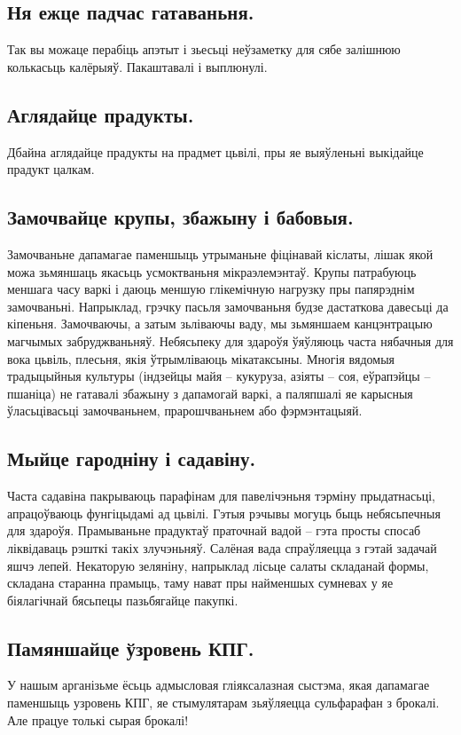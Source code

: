 \subsection{Ня ежце падчас гатаваньня.}
Так вы можаце перабіць апэтыт і зьесьці неўзаметку для сябе залішнюю колькасьць калёрыяў. Пакаштавалі і выплюнулі.

\subsection{Аглядайце прадукты.}
Дбайна аглядайце прадукты на прадмет цьвілі, пры яе выяўленьні выкідайце прадукт цалкам.

\subsection{Замочвайце крупы, збажыну і бабовыя.}
Замочваньне дапамагае паменшыць утрыманьне фіцінавай кіслаты, лішак якой можа зьмяншаць якасьць усмоктваньня мікраэлемэнтаў. Крупы патрабуюць меншага часу варкі і даюць меншую глікемічную нагрузку пры папярэднім замочваньні. Напрыклад, грэчку пасьля замочваньня будзе дастаткова давесьці да кіпеньня. Замочваючы, а затым зьліваючы ваду, мы зьмяншаем канцэнтрацыю магчымых забруджваньняў. Небясьпеку для здароўя ўяўляюць часта нябачныя для вока цьвіль, плесьня, якія ўтрымліваюць мікатаксыны. Многія вядомыя традыцыйныя культуры (індзейцы майя – кукуруза, азіяты – соя, еўрапэйцы – пшаніца) не гатавалі збажыну з дапамогай варкі, а паляпшалі яе карысныя ўласьцівасьці замочваньнем, прарошчваньнем або фэрмэнтацыяй.

\subsection{Мыйце гародніну і садавіну.}
Часта садавіна пакрываюць парафінам для павелічэньня тэрміну прыдатнасьці, апрацоўваюць фунгіцыдамі ад цьвілі. Гэтыя рэчывы могуць быць небясьпечныя для здароўя. Прамываньне прадуктаў праточнай вадой – гэта просты спосаб ліквідаваць рэшткі такіх злучэньняў. Салёная вада спраўляецца з гэтай задачай яшчэ лепей. Некаторую зеляніну, напрыклад лісьце салаты складанай формы, складана старанна прамыць, таму нават пры найменшых сумневах у яе біялагічнай бясьпецы пазьбягайце пакупкі.

\subsection{Памяншайце ўзровень КПГ.}
У нашым арганізьме ёсьць адмысловая гліяксалазная сыстэма, якая дапамагае паменшыць узровень КПГ, яе стымулятарам зьяўляецца сульфарафан з брокалі. Але працуе толькі сырая брокалі!

